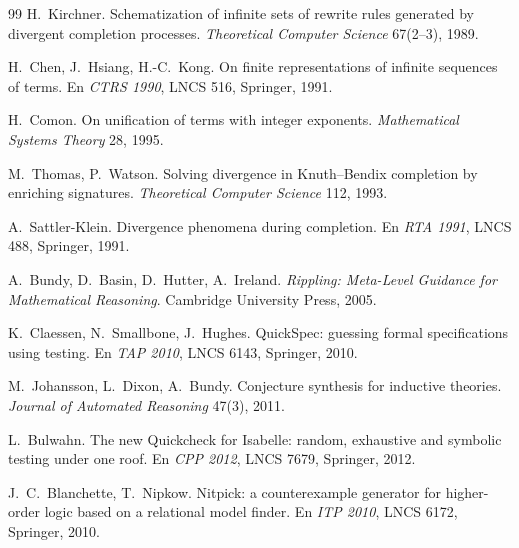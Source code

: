 \documentclass[11pt,a4paper]{article}
\theoremstyle{definition}
\theoremstyle{remark}
\begin{document}
\begin{thebibliography}{99}
H.~Kirchner.
\newblock Schematization of infinite sets of rewrite rules generated by divergent
  completion processes.
\newblock \emph{Theoretical Computer Science} 67(2--3), 1989.

H.~Chen, J.~Hsiang, H.-C.~Kong.
\newblock On finite representations of infinite sequences of terms.
\newblock En \emph{CTRS 1990}, LNCS 516, Springer, 1991.

H.~Comon.
\newblock On unification of terms with integer exponents.
\newblock \emph{Mathematical Systems Theory} 28, 1995.

M.~Thomas, P.~Watson.
\newblock Solving divergence in Knuth--Bendix completion by enriching signatures.
\newblock \emph{Theoretical Computer Science} 112, 1993.

A.~Sattler-Klein.
\newblock Divergence phenomena during completion.
\newblock En \emph{RTA 1991}, LNCS 488, Springer, 1991.

A.~Bundy, D.~Basin, D.~Hutter, A.~Ireland.
\newblock \emph{Rippling: Meta-Level Guidance for Mathematical Reasoning}.
\newblock Cambridge University Press, 2005.

K.~Claessen, N.~Smallbone, J.~Hughes.
\newblock QuickSpec: guessing formal specifications using testing.
\newblock En \emph{TAP 2010}, LNCS 6143, Springer, 2010.

M.~Johansson, L.~Dixon, A.~Bundy.
\newblock Conjecture synthesis for inductive theories.
\newblock \emph{Journal of Automated Reasoning} 47(3), 2011.

L.~Bulwahn.
\newblock The new Quickcheck for Isabelle: random, exhaustive and symbolic testing
  under one roof.
\newblock En \emph{CPP 2012}, LNCS 7679, Springer, 2012.

J.~C.~Blanchette, T.~Nipkow.
\newblock Nitpick: a counterexample generator for higher-order logic based on a
  relational model finder.
\newblock En \emph{ITP 2010}, LNCS 6172, Springer, 2010.

\end{thebibliography}
\end{document}
